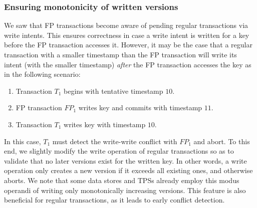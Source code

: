 \subsubsection{Ensuring monotonicity of written versions} \label{ssec:regular-client-alg}

We saw that FP transactions become aware of pending regular transactions via write intents. This ensures correctness
in case a write intent is written for a key before the FP transaction accesses it. However, it may be the
case that a regular transaction with a smaller timestamp than the FP transaction will write its intent (with 
the smaller timestamp) \emph{after} the FP transaction accesses the key as in the following scenario:
\begin{enumerate}
\item Transaction $T_1$ begins with tentative timestamp $10$.  
\item FP transaction $FP_1$ writes key and commits with timestamp $11$.  
\item Transaction $T_1$ writes key with timestamp $10$.  
\end{enumerate}
In this case, $T_1$ must detect the write-write conflict with $FP_1$ and abort.
To this end, we slightly modify the write operation of regular transactions so as to validate that no 
later versions exist for the written key. In other words, a write operation only creates a new version if it exceeds all
existing ones, and otherwise aborts.
We note that  some data stores and TPSs already employ this modus operandi of writing only monotonically increasing versions.
This feature is also beneficial for regular transactions, as it leads to early conflict detection.




